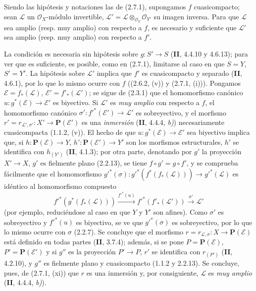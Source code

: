 \begin{corollary}[2.7.2]
\label{IV.2.7.2-fr}
Siendo las hipótesis y notaciones las de \textup{(2.7.1)}, supongamos $f$
cuasicompacto; sean $\mathcal L$ un $\mathcal O_X$-módulo invertible,
$\mathcal L'=\mathcal L\otimes_{\mathcal O_Y}\mathcal O_{Y'}$ su imagen
inversa. Para que $\mathcal L$ sea amplio \textup{(resp.} muy amplio\textup{)} con respecto a
$f$, es necesario y suficiente que $\mathcal L'$ sea amplio \textup{(resp.} muy
amplio\textup{)} con respecto a $f'$.
\end{corollary}

La condición es necesaria sin hipótesis sobre $g:S'\to S$ (\textbf{II}, 4.4.10 y
4.6.13); para ver que es suficiente, es posible, como en (2.7.1), limitarse al
caso en que $S=Y$, $S'=Y'$. La hipótesis sobre $\mathcal L'$ implica que
$f'$ es cuasicompacto y separado (\textbf{II}, 4.6.1), por lo que lo mismo ocurre con
$f$ ((2.6.2, (v)) y (2.7.1, (i))). Pongamos
$\mathcal E=f_*(\mathcal L)$, $\mathcal E'=f'_*(\mathcal L')$; se sigue de
(2.3.1) que el homomorfismo canónico
$u:g^*(\mathcal E)\to\mathcal E'$ es biyectivo. Si $\mathcal L'$ es \emph{muy
amplio} con respecto a $f$, el homomorfismo canónico
$\sigma':f'^*(\mathcal E')\to\mathcal L'$ es sobreyectivo, y el morfismo
$r'=r_{\mathcal L',\sigma'}:X'\to\mathbf P(\mathcal E')$
es una \emph{inmersión} (\textbf{II}, 4.4.4, \emph{b)}) necesariamente cuasicompacta (1.1.2,
(v)). El hecho de que $u:g^*(\mathcal E)\to\mathcal E'$ sea biyectivo
implica que, si $h:\mathbf P(\mathcal E)\to Y$,
$h':\mathbf P(\mathcal E')\to Y'$ son los morfismos estructurales, $h'$ se
identifica con $h_{(Y')}$ (\textbf{II}, 4.1.3); por otra parte, denotando por $g'$ la
proyección $X'\to X$, $g'$ es fielmente plano (2.2.13), se tiene
$f\circ g'=g\circ f'$, y se comprueba fácilmente que el homomorfismo
$g'^*(\sigma):g'^*(f^*(f_*(\mathcal L)))\to g'^*(\mathcal L)$
es idéntico al homomorfismo compuesto
\[
f'^*(g^*(f_*(\mathcal L)))\xrightarrow{f'^*(u)}
f'^*(f'_*(\mathcal L'))\xrightarrow{\sigma'}\mathcal L'
\]
(por ejemplo, reduciéndose al caso en que $Y$ y $Y'$ son afines). Como
$\sigma'$ es sobreyectivo y $f'^*(u)$ es biyectivo, se ve que
$g'^*(\sigma)$ es sobreyectivo, por lo que lo mismo ocurre con $\sigma$
(2.2.7). Se concluye que el morfismo
$r=r_{\mathcal L,\sigma}:X\to\mathbf P(\mathcal E)$ está definido en todas
partes (\textbf{II}, 3.7.4); además, si se pone $P=\mathbf P(\mathcal E)$,
$P'=\mathbf P(\mathcal E')$ y si $g''$ es la proyección $P'\to P$, $r'$ se
identifica con $r_{(P')}$ (\textbf{II}, 4.2.10), y $g''$ es fielmente plano y
cuasicompacto (1.1.2 y 2.2.13). Se concluye, pues, de (2.7.1, (xi)) que $r$
es una inmersión y, por consiguiente, $\mathcal L$ es \emph{muy amplio} (\textbf{II}, 4.4.4,
\emph{b)}).

